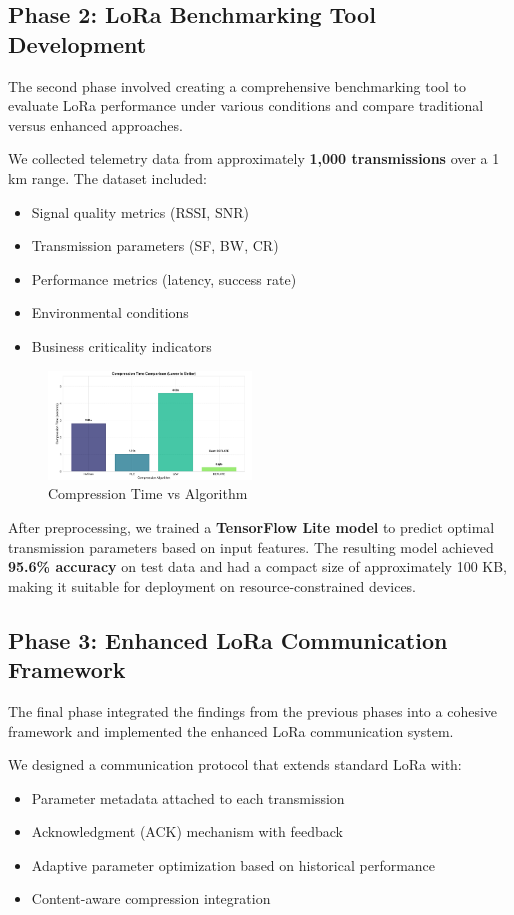 \documentclass[conference]{IEEEtran}
\begin{document}
\subsection{Phase 2: LoRa Benchmarking Tool Development}
The second phase involved creating a comprehensive benchmarking tool to evaluate LoRa performance under various conditions and compare traditional versus enhanced approaches.

We collected telemetry data from approximately \textbf{1,000 transmissions} over a 1 km range. The dataset included:
\begin{itemize}
    \item Signal quality metrics (RSSI, SNR)
    \item Transmission parameters (SF, BW, CR)
    \item Performance metrics (latency, success rate)
    \item Environmental conditions
    \item Business criticality indicators
\end{itemize}

\begin{figure}[htbp]
\centering
\includegraphics[width=0.48\textwidth]{images/compression-time-vs-algorithm.png}
\caption{Compression Time vs Algorithm}
\label{fig:compression_time}
\end{figure}

After preprocessing, we trained a \textbf{TensorFlow Lite model} to predict optimal transmission parameters based on input features. The resulting model achieved \textbf{95.6\% accuracy} on test data and had a compact size of approximately 100 KB, making it suitable for deployment on resource-constrained devices.

\subsection{Phase 3: Enhanced LoRa Communication Framework}
The final phase integrated the findings from the previous phases into a cohesive framework and implemented the enhanced LoRa communication system.

We designed a communication protocol that extends standard LoRa with:
\begin{itemize}
    \item Parameter metadata attached to each transmission
    \item Acknowledgment (ACK) mechanism with feedback
    \item Adaptive parameter optimization based on historical performance
    \item Content-aware compression integration
\end{itemize}
\end{document}

